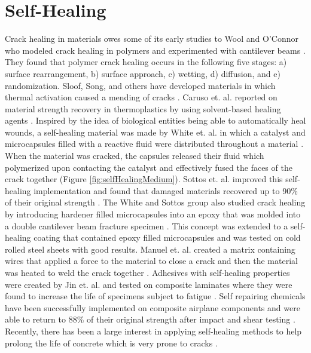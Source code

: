 \section{Self-Healing}

Crack healing in materials owes some of its early studies to Wool and O'Connor who modeled crack healing in polymers and experimented with cantilever beams \cite{Wool1981, Wool1982}. They found that polymer crack healing occurs in the following five stages: a) surface rearrangement, b) surface approach, c) wetting, d) diffusion, and e) randomization. Sloof, Song, and others have developed materials in which thermal activation caused a mending of cracks \cite{Song2009, Sloof2009, Bosman2009, Djugum2009, Luo2009}. Caruso et. al. reported on material strength recovery in thermoplastics by using solvent-based healing agents \cite{Caruso2009}. Inspired by the idea of biological entities being able to automatically heal wounds, a self-healing material was made by White et. al. in which a catalyst and microcapsules filled with a reactive fluid were distributed throughout a material \cite{White2001}. When the material was cracked, the capsules released their fluid which polymerized upon contacting the catalyst and effectively fused the faces of the crack together (Figure \ref{fig:selfHealingMedium}). Sottos et. al. improved this self-healing implementation and found that damaged materials recovered up to 90\% of their original strength \cite{Sottos2009}. The White and Sottos group also studied crack healing by introducing hardener filled microcapsules into an epoxy that was molded into a double cantilever beam fracture specimen \cite{Mcllroy2009}. This concept was extended to a self-healing coating that contained epoxy filled microcapsules and was tested on cold rolled steel sheets with good results\cite{Zhao2012}. Manuel et. al. created a matrix containing wires that applied a force to the material to close a crack and then the material was heated to weld the crack together \cite{Manuel2009}. Adhesives with self-healing properties were created by Jin et. al. and tested on composite laminates where they were found to increase the life of specimens subject to fatigue \cite{Jin2009}. Self repairing chemicals have been successfully implemented on composite airplane components and were able to return to 88\% of their original strength after impact and shear testing \cite{Dry2009}. Recently, there has been a large interest in applying self-healing methods to help prolong the life of concrete which is very prone to cracks \cite{Wu2012}. 

